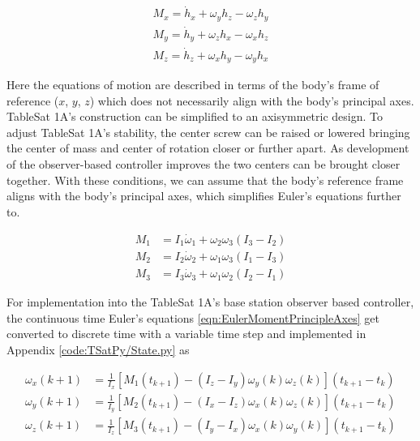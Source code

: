 \begin{subequations}
  \begin{align}
    M_x = \dot{h}_x + \omega_y h_z - \omega_z h_y \\
    M_y = \dot{h}_y + \omega_z h_x - \omega_x h_z \\
    M_z = \dot{h}_z + \omega_x h_y - \omega_y h_x
  \end{align}
  \label{eqn:EulerMoment}
\end{subequations}

Here the equations of motion are described in terms of the body's frame of reference ($x$, $y$, $z$) which does not necessarily align with the body's principal axes.  TableSat 1A's construction can be simplified to an axisymmetric design.  To adjust TableSat 1A's stability, the center screw can be raised or lowered bringing the center of mass and center of rotation closer or further apart.  As development of the observer-based controller improves the two centers can be brought closer together.  With these conditions, we can assume that the body's reference frame aligns with the body's principal axes, which simplifies Euler's equations further to.

\begin{subequations}
  \begin{align}
    M_1 & = I_1 \dot{\omega}_1 + \omega_2 \omega_3 (I_3 - I_2) \\
    M_2 & = I_2 \dot{\omega}_2 + \omega_1 \omega_3 (I_1 - I_3) \\
    M_3 & = I_3 \dot{\omega}_3 + \omega_1 \omega_2 (I_2 - I_1)
  \end{align}
  \label{eqn:EulerMomentPrincipleAxes}
\end{subequations}

For implementation into the TableSat 1A's base station observer based controller, the continuous time Euler's equations \ref{eqn:EulerMomentPrincipleAxes} get converted to discrete time with a variable time step and implemented in Appendix \ref{code:TSatPy/State.py} as

\begin{subequations}
  \begin{align}
    \omega_{x}(k+1) & = \frac{1}{I_x} \left[ M_1(t_{k+1}) - (I_z - I_y) \omega_{y}(k) \omega_{z}(k) \right] (t_{k+1} - t_{k}) \\
    \omega_{y}(k+1) & = \frac{1}{I_y} \left[ M_2(t_{k+1}) - (I_x - I_z) \omega_{x}(k) \omega_{z}(k) \right] (t_{k+1} - t_{k}) \\
    \omega_{z}(k+1) & = \frac{1}{I_z} \left[ M_3(t_{k+1}) - (I_y - I_x) \omega_{x}(k) \omega_{y}(k) \right] (t_{k+1} - t_{k})
  \end{align}
  \label{eqn:DiscreteEulerMomentEquations}
\end{subequations}

